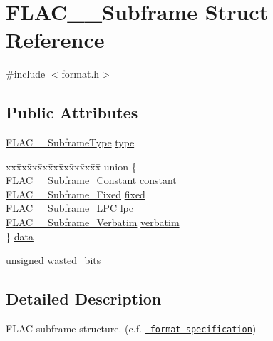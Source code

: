 \hypertarget{struct_f_l_a_c_____subframe}{}\section{F\+L\+A\+C\+\_\+\+\_\+\+Subframe Struct Reference}
\label{struct_f_l_a_c_____subframe}


{\ttfamily \#include $<$format.\+h$>$}

\subsection*{Public Attributes}
\begin{DoxyCompactItemize}
\item 
\mbox{\hyperlink{group__flac__format_ga1f431eaf213e74d7747589932d263348}{F\+L\+A\+C\+\_\+\+\_\+\+Subframe\+Type}} \mbox{\hyperlink{struct_f_l_a_c_____subframe_a1de133ee69f416636e24a990d4bd6b44}{type}}
\item 
\begin{tabbing}
xx\=xx\=xx\=xx\=xx\=xx\=xx\=xx\=xx\=\kill
union \{\\
\>\mbox{\hyperlink{struct_f_l_a_c_____subframe___constant}{FLAC\_\_Subframe\_Constant}} \mbox{\hyperlink{struct_f_l_a_c_____subframe_a2b6c0b6a78e11a3f07ad018ebdbae053}{constant}}\\
\>\mbox{\hyperlink{struct_f_l_a_c_____subframe___fixed}{FLAC\_\_Subframe\_Fixed}} \mbox{\hyperlink{struct_f_l_a_c_____subframe_a62b0c96288ec264ca09aba6c7c26fc0b}{fixed}}\\
\>\mbox{\hyperlink{struct_f_l_a_c_____subframe___l_p_c}{FLAC\_\_Subframe\_LPC}} \mbox{\hyperlink{struct_f_l_a_c_____subframe_a298cb7680a387b1b95815cd51648f400}{lpc}}\\
\>\mbox{\hyperlink{struct_f_l_a_c_____subframe___verbatim}{FLAC\_\_Subframe\_Verbatim}} \mbox{\hyperlink{struct_f_l_a_c_____subframe_ae7b7d3263298a9326f3ac3e9d56b2a6c}{verbatim}}\\
\} \mbox{\hyperlink{struct_f_l_a_c_____subframe_a18e4a6dcea5c177099c2b5e85365450a}{data}}\\

\end{tabbing}\item 
unsigned \mbox{\hyperlink{struct_f_l_a_c_____subframe_a96a6848ded4e90e26d54f0dd7066c306}{wasted\+\_\+bits}}
\end{DoxyCompactItemize}


\subsection{Detailed Description}
F\+L\+AC subframe structure. (c.\+f. \href{../format.html\#subframe}{\texttt{ format specification}}) 

